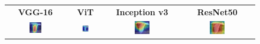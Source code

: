 \documentclass[a4paper,12pt]{report}
\begin{document}
\begin{figure}[H]
    \centering
    \setlength{\tabcolsep}{1pt}
    \begin{tabular}{cccc}
    \textbf{VGG-16} & \textbf{ViT} & \textbf{Inception v3} & \textbf{ResNet50} \\
    
    \includegraphics[width=0.22\textwidth]{images/appendix/modelgraph/vgg/correct/Glaucous_Winged_Gull/20241204_170956.jpg} &
    \includegraphics[width=0.22\textwidth]{images/appendix/modelgraph/vit/correct/Glaucous_Winged_Gull/20241204_170956.jpg} &
    \includegraphics[width=0.22\textwidth]{images/appendix/modelgraph/inception/correct/Glaucous_Winged_Gull/20241204_170956.jpg} &
    \includegraphics[width=0.22\textwidth]{images/appendix/modelgraph/resnet/correct/Glaucous_Winged_Gull/20241204_170956.jpg} \\
    \end{tabular}

    \label{fig:interpretability_glaucous_3}
\end{figure}
\end{document}
